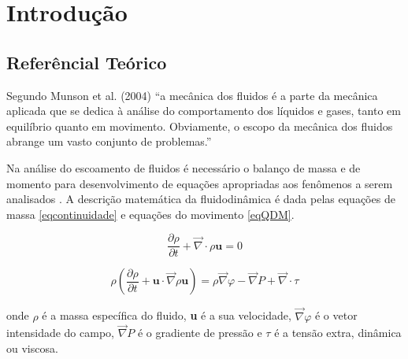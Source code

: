 \chapter{Introdução}\label{intro}

\section{Referêncial Teórico}

Segundo Munson et al. (2004) \cite{Munson04} ``a mecânica dos fluidos é a parte 
da mecânica aplicada que se dedica à
análise do comportamento dos líquidos e gases, tanto em equilíbrio quanto em 
movimento. Obviamente, o escopo da mecânica
dos fluidos abrange um vasto conjunto de 
problemas.''

Na análise do escoamento de fluidos é necessário o 
balanço de massa e de momento para desenvolvimento de equações
apropriadas aos fenômenos a serem analisados \cite{Cremasco14}.
A descrição matemática da fluidodinâmica é dada pelas 
equações de massa \eqref{eqcontinuidade}
e equações do movimento \eqref{eqQDM}.

\begin{equation}\label{eqcontinuidade}
    \frac{\partial\rho}{\partial t} + 
    \vec{\nabla} \cdot \rho \textbf{u}  = 0
\end{equation}

\begin{equation}\label{eqQDM}
    \rho \left(
        \frac{\partial \rho}{\partial t} + 
    \textbf{u} \cdot \vec{\nabla}\rho\textbf{u}
    \right)
    = 
    \rho\vec{\nabla}\varphi -
    \vec{\nabla} P +
    \vec{\nabla}\cdot \tau
\end{equation}

onde $\rho$ é a massa específica do fluido, \textbf{u} é a sua velocidade,
$\vec{\nabla}\varphi$ é o vetor intensidade do campo, $\vec{\nabla} P$ é o gradiente
de pressão e $\tau$ é a tensão extra, dinâmica ou viscosa.


